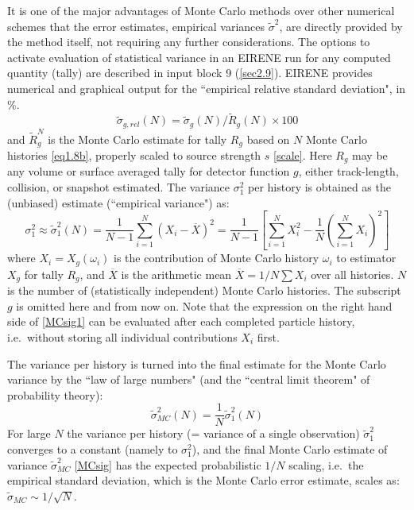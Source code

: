 It is one of the major advantages of Monte Carlo methods over other numerical
schemes that the error estimates, empirical variances $\tilde\sigma^2$, are
directly provided by the method itself, not requiring any further
considerations.
The options to activate evaluation of statistical variance in an EIRENE run for
any computed quantity (tally) are described in input block 9 (\cref{sec2.9}).
EIRENE provides numerical and graphical output for the ``empirical relative
standard deviation", in \%.
\begin{equation}
  \tilde\sigma_{g,rel}
  (N) = \tilde\sigma_g(N)/\tilde R_g(N) \times 100
\end{equation}
and $\tilde
  R_g^N$ is the Monte Carlo estimate for tally $R_g$  based on $N$ Monte Carlo
histories \cref{eq1.8b}, properly scaled to source strength $s$ \cref{scale}.
Here $R_g$ may be any volume or surface averaged tally for detector function
$g$, either track-length, collision, or snapshot estimated.
The  variance $\sigma^2_1$ per history is obtained as the (unbiased) estimate
(``empirical variance") as:
\begin{equation}
  \label{MCsig1}
  \sigma^2_1 \approx \tilde\sigma^2_1(N) = \frac{1}{N-1}\sum_{i=1}^N
  (X_i-\overline{X})^2=\frac 1{N-1}\left[\sum_{i=1}^N X_i^2 - \frac 1N
    \left(\sum_{i=1}^N X_i\right)^2\right]
\end{equation}
where $X_i= X_g(\omega_i)$ is the contribution of Monte Carlo history
$\omega_i$ to
estimator $X_g$ for tally $R_g$, and
$\overline{X}
$ is the arithmetic mean $\overline{X}=1/N\sum X_i$ over all histories.
$N$ is the number of (statistically independent) Monte Carlo histories.
The subscript $g$ is omitted here and from now on.
Note that the expression on the right hand side of \cref{MCsig1} can be
evaluated after each completed particle history, i.e.\ without storing all
individual contributions $X_i$ first.

The variance per history is turned into the final estimate for the Monte Carlo
variance by the ``law of large numbers" (and the ``central limit theorem" of
probability theory):
\begin{equation}
  \label{MCsig}
  \tilde\sigma^2_{MC}
  (N)=\frac 1N \tilde \sigma_1^2(N)
\end{equation}
For large $N$ the variance per
history (= variance of a single observation) $\tilde\sigma_1^2$ converges to a
constant (namely to $\sigma^2_1$), and the final Monte Carlo estimate of
variance $\tilde \sigma^2_{MC}$ \cref{MCsig} has the expected probabilistic
$1/N$ scaling, i.e.\ the empirical standard deviation, which is the Monte Carlo
error estimate,  scales as:
$\tilde\sigma_{MC} \sim 1/\sqrt{N}$.

